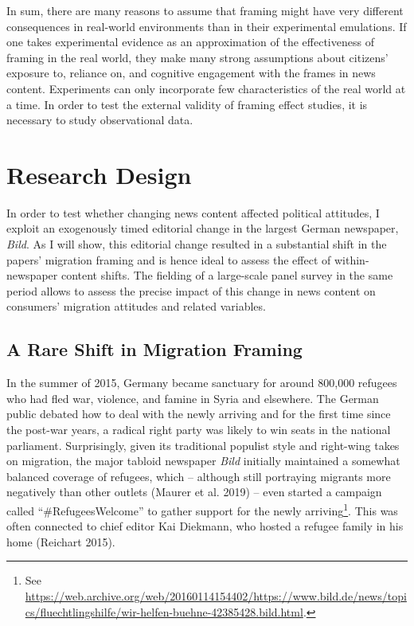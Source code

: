 \documentclass[
  12pt,
]{article}
\begin{document}
In sum, there are many reasons to assume that framing might have very different consequences in real-world environments than in their experimental emulations. If one takes experimental evidence as an approximation of the effectiveness of framing in the real world, they make many strong assumptions about citizens' exposure to, reliance on, and cognitive engagement with the frames in news content. Experiments can only incorporate few characteristics of the real world at a time. In order to test the external validity of framing effect studies, it is necessary to study observational data.

\hypertarget{research-design}{%
\section{Research Design}\label{research-design}}

In order to test whether changing news content affected political attitudes, I exploit an exogenously timed editorial change in the largest German newspaper, \emph{Bild}. As I will show, this editorial change resulted in a substantial shift in the papers' migration framing and is hence ideal to assess the effect of within-newspaper content shifts. The fielding of a large-scale panel survey in the same period allows to assess the precise impact of this change in news content on consumers' migration attitudes and related variables.

\hypertarget{a-rare-shift-in-migration-framing}{%
\subsection{A Rare Shift in Migration Framing}\label{a-rare-shift-in-migration-framing}}

In the summer of 2015, Germany became sanctuary for around 800,000 refugees who had fled war, violence, and famine in Syria and elsewhere. The German public debated how to deal with the newly arriving and for the first time since the post-war years, a radical right party was likely to win seats in the national parliament. Surprisingly, given its traditional populist style and right-wing takes on migration, the major tabloid newspaper \emph{Bild} initially maintained a somewhat balanced coverage of refugees, which -- although still portraying migrants more negatively than other outlets (Maurer et al. 2019) -- even started a campaign called ``\#RefugeesWelcome'' to gather support for the newly arriving\footnote{See \url{https://web.archive.org/web/20160114154402/https://www.bild.de/news/topics/fluechtlingshilfe/wir-helfen-buehne-42385428.bild.html}.}. This was often connected to chief editor Kai Diekmann, who hosted a refugee family in his home (Reichart 2015).
\end{document}
